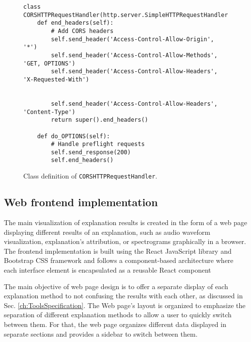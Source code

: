 \documentclass[
    bindingoffset=5mm,  %
    footnoteindent=3mm, %
    hyphenation=true    %
]{src/wut-thesis}
\begin{document}
\begin{figure}%
\begin{verbatim}
class CORSHTTPRequestHandler(http.server.SimpleHTTPRequestHandler):
    def end_headers(self):
        # Add CORS headers
        self.send_header('Access-Control-Allow-Origin', '*')
        self.send_header('Access-Control-Allow-Methods', 'GET, OPTIONS')
        self.send_header('Access-Control-Allow-Headers', 'X-Requested-With')

        
        self.send_header('Access-Control-Allow-Headers', 'Content-Type')
        return super().end_headers()

    def do_OPTIONS(self):
        # Handle preflight requests
        self.send_response(200)
        self.end_headers()
\end{verbatim}
\caption{Class definition of \texttt{CORSHTTPRequestHandler}.}
\label{fig:CORSHTTPRequestHandler}
\end{figure}

\subsection{Web frontend implementation} \label{ch:ch5WebFrontend}

The main visualization of explanation results is created in the form of a web page displaying different results of
an explanation, such as audio waveform visualization, explanation’s attribution, or spectrograms graphically in a
browser. The frontend implementation is built using the React JavaScript library \cite{ReactDOC}
and Bootstrap CSS framework \cite{BootstrapDOC} and follows a component-based architecture where each interface
element is encapsulated as a reusable React component


The main objective of web page design is to offer a separate display of each explanation method to not
confusing the results with each other, as discussed in Sec. \ref{ch:ToolsSpecification}.
The Web page’s layout is organized to emphasize the separation of different explanation methods to allow
a user to quickly switch between them. For that, the web page organizes different data displayed in
separate sections and provides a sidebar to switch between them.
\end{document}
